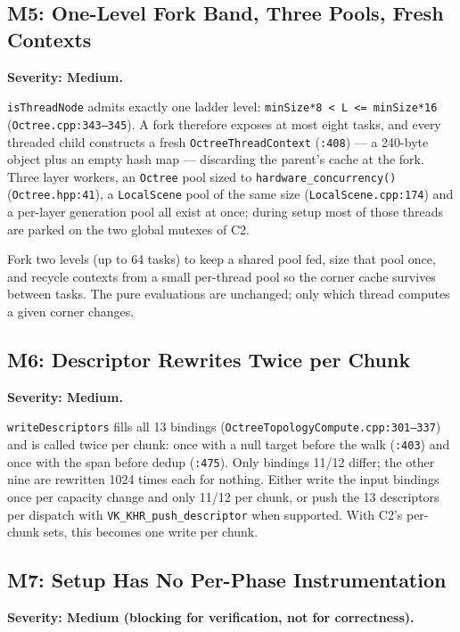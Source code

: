 \documentclass[11pt,a4paper]{article}
\begin{document}
\subsection{M5: One-Level Fork Band, Three Pools, Fresh Contexts}

\textbf{Severity: Medium.}

\texttt{isThreadNode} admits exactly one ladder level:
\texttt{minSize*8 < L <= minSize*16} (\texttt{Octree.cpp:343--345}). A fork
therefore exposes at most eight tasks, and every threaded child constructs a
fresh \texttt{OctreeThreadContext} (\texttt{:408}) --- a 240-byte object plus
an empty hash map --- discarding the parent's cache at the fork. Three layer
workers, an \texttt{Octree} pool sized to
\texttt{hardware\_concurrency()} (\texttt{Octree.hpp:41}), a
\texttt{LocalScene} pool of the same size (\texttt{LocalScene.cpp:174}) and a
per-layer generation pool all exist at once; during setup most of those
threads are parked on the two global mutexes of C2.

Fork two levels (up to 64 tasks) to keep a shared pool fed, size that pool
once, and recycle contexts from a small per-thread pool so the corner cache
survives between tasks. The pure evaluations are unchanged; only which
thread computes a given corner changes.

\subsection{M6: Descriptor Rewrites Twice per Chunk}

\textbf{Severity: Medium.}

\texttt{writeDescriptors} fills all 13 bindings
(\texttt{OctreeTopologyCompute.cpp:301--337}) and is called twice per chunk:
once with a null target before the walk (\texttt{:403}) and once with the
span before dedup (\texttt{:475}). Only bindings 11/12 differ; the other
nine are rewritten 1024 times each for nothing. Either write the input
bindings once per capacity change and only 11/12 per chunk, or push the 13
descriptors per dispatch with \texttt{VK\_KHR\_push\_descriptor} when
supported. With C2's per-chunk sets, this becomes one write per chunk.

\subsection{M7: Setup Has No Per-Phase Instrumentation}

\textbf{Severity: Medium (blocking for verification, not for correctness).}
\end{document}
